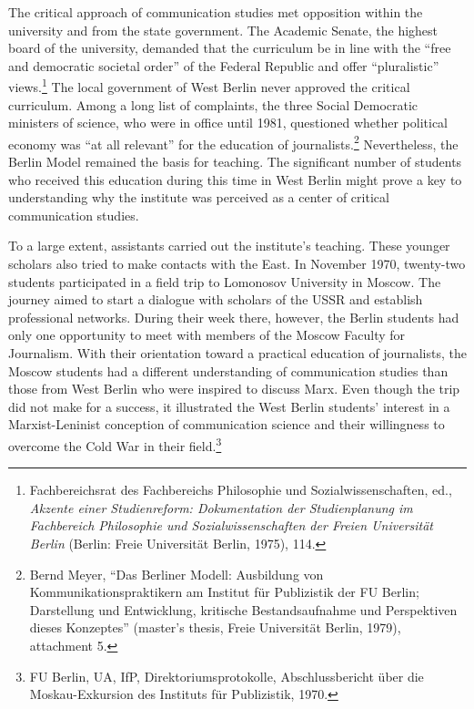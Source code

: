 \documentclass{tufte-handout}
\begin{document}
The critical approach of communication studies met opposition within the
university and from the state government. The Academic Senate, the
highest board of the university, demanded that the curriculum be in line
with the ``free and democratic societal order'' of the Federal Republic
and offer ``pluralistic'' views.\footnote{Fachbereichsrat des
  Fachbereichs Philosophie und Sozialwissenschaften, ed., \emph{Akzente
  einer Studienreform: Dokumentation der Studienplanung im Fachbereich
  Philosophie und Sozialwissenschaften der Freien Universität Berlin}
  (Berlin: Freie Universität Berlin, 1975), 114.} The local government
of West Berlin never approved the critical curriculum. Among a long list
of complaints, the three Social Democratic ministers of science, who
were in office until 1981, questioned whether political economy was ``at
all relevant'' for the education of journalists.\footnote{Bernd Meyer,
  ``Das Berliner Modell: Ausbildung von Kommunikationspraktikern am
  Institut für Publizistik der FU Berlin; Darstellung und Entwicklung,
  kritische Bestandsaufnahme und Perspektiven dieses Konzeptes''
  (master's thesis, Freie Universität Berlin, 1979), attachment 5.}
Nevertheless, the Berlin Model remained the basis for teaching. The
significant number of students who received this education during this
time in West Berlin might prove a key to understanding why the institute
was perceived as a center of critical communication studies.

To a large extent, assistants carried out the institute's teaching.
These younger scholars also tried to make contacts with the East. In
November 1970, twenty-two students participated in a field trip to
Lomonosov University in Moscow. The journey aimed to start a dialogue
with scholars of the USSR and establish professional networks. During
their week there, however, the Berlin students had only one opportunity
to meet with members of the Moscow Faculty for Journalism. With their
orientation toward a practical education of journalists, the Moscow
students had a different understanding of communication studies than
those from West Berlin who were inspired to discuss Marx. Even though
the trip did not make for a success, it illustrated the West Berlin
students' interest in a Marxist-Leninist conception of communication
science and their willingness to overcome the Cold War in their
field.\footnote{FU Berlin, UA, IfP, Direktoriumsprotokolle,
  Abschlussbericht über die Moskau-Exkursion des Instituts für
  Publizistik, 1970.}
\end{document}
